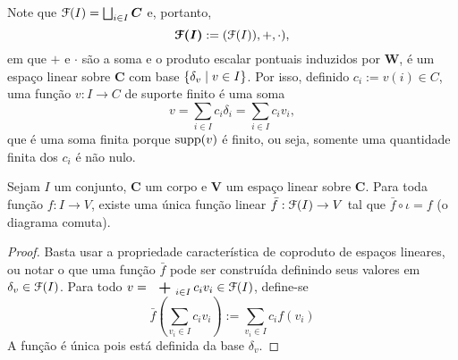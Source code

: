 Note que $\mathcal{F}(I) = \bigsqcup_{i \in I} \bm C$ e, portanto,
	\begin{equation*}
	\bm{\mathcal{F}(I)} := (\mathcal{F}(I)),+,\cdot),
	\end{equation*}
em que $+$ e $\cdot$ são a soma e o produto escalar pontuais induzidos por $\bm W$, é um espaço linear sobre $\bm C$ com base $\left\{{\delta_v}\;\middle\vert\;{v \in I}\right\}$. Por isso, definido $c_i := v(i) \in C$, uma função $v: I \to C$ de suporte finito é uma soma
	\begin{equation*}
	v = \sum_{i \in I} c_i \delta_i = \sum_{i \in I} c_i v_i,
	\end{equation*}
que é uma soma finita porque $\operatorname{supp}(v)$ é finito, ou seja, somente uma quantidade finita dos $c_i$ é não nulo.

\begin{proposition}
Sejam $I$ um conjunto, $\bm C$ um corpo e $\bm V$ um espaço linear sobre $\bm C$. Para toda função $f: I \to V$, existe uma única função linear $\bar f: \mathcal{F}(I) \to V$ tal que $\bar f \circ \iota = f$ (o diagrama comuta).
\begin{figure}
\centering
{}
\end{figure}
\end{proposition}
\begin{proof} Basta usar a propriedade característica de coproduto de espaços lineares, ou notar o que uma função $\bar f$ pode ser construída definindo seus valores em $\delta_v \in \mathcal{F}(I)$. Para todo $v=\sum_{i \in I} c_i v_i \in \liv(I)$, define-se
	\begin{equation*}
	\bar f\left(\sum_{v_i \in I} c_i v_i\right):= \sum_{v_i \in I} c_i f(v_i)
	\end{equation*}
A função é única pois está definida da base $\delta_v$.
\end{proof}

